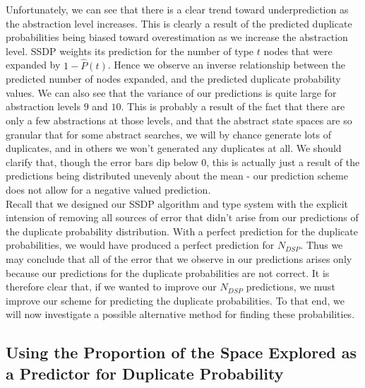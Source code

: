 \documentclass{article}
\begin{document}
Unfortunately, we can see that there is a clear trend toward underprediction as the abstraction level increases.
This is clearly a result of the predicted duplicate probabilities being biased toward
overestimation as we increase the abstraction level.
SSDP weights its prediction for the number of type \(t\) nodes that were expanded by \(1 - \hat{P}(t)\).
Hence we observe an inverse relationship between the predicted number of nodes expanded,
and the predicted duplicate probability values.
We can also see that the variance of our predictions is quite large for abstraction levels \(9\) and \(10\).
This is probably a result of the fact that there are only a few abstractions at those levels,
and that the abstract state spaces are so granular that for some abstract searches,
we will by chance generate lots of duplicates,
and in others we won't generated any duplicates at all.
We should clarify that, though the error bars dip below \(0\),
this is actually just a result of the predictions being distributed unevenly about the mean -
our prediction scheme does not allow for a negative valued prediction. \\

Recall that we designed our SSDP algorithm and type system with the explicit intension of
removing all sources of error that didn't arise from our predictions of the duplicate probability distribution.
With a perfect prediction for the duplicate probabilities, we would have produced a perfect prediction
for \(N_{DSP}\). Thus we may conclude that all of the error that we observe in our predictions
arises only because our predictions for the duplicate probabilities are not correct.
It is therefore clear that, if we wanted to improve our \(N_{DSP}\) predictions,
we must improve our scheme for predicting the duplicate probabilities.
To that end, we will now investigate a possible alternative method for finding these probabilities.

\subsection{Using the Proportion of the Space Explored as a Predictor for Duplicate Probability}
\end{document}
